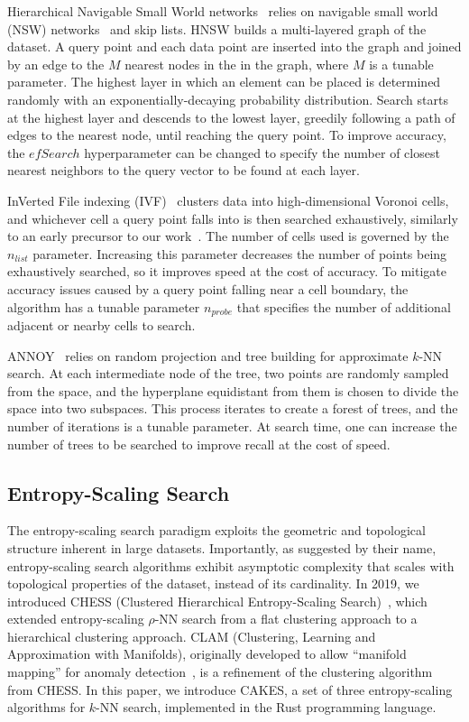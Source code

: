 Hierarchical Navigable Small World networks~\cite{malkov2016hnsw} relies on navigable small world (NSW) networks~\cite{kleinberg2000navigation, boguna2009navigability} and skip lists.
HNSW builds a multi-layered graph of the dataset.
A query point and each data point are inserted into the graph and joined by an edge to the $M$ nearest nodes in the in the graph, where $M$ is a tunable parameter.
The highest layer in which an element can be placed is determined randomly with an exponentially-decaying probability distribution.
Search starts at the highest layer and descends to the lowest layer, greedily following a path of edges to the nearest node, until reaching the query point.
To improve accuracy, the $efSearch$ hyperparameter can be changed to specify the number of closest nearest neighbors to the query vector to be found at each layer.

InVerted File indexing (IVF)~\cite{faissivf, sacks1987multikey, kent1990signature} clusters data into high-dimensional Voronoi cells, and whichever cell a query point falls into is then searched exhaustively, similarly to an early precursor to our work~\cite{yu2015entropy}.
The number of cells used is governed by the $n_{list}$ parameter.
Increasing this parameter decreases the number of points being exhaustively searched, so it improves speed at the cost of accuracy.
To mitigate accuracy issues caused by a query point falling near a cell boundary, the algorithm has a tunable parameter $n_{probe}$ that specifies the number of additional adjacent or nearby cells to search.

ANNOY~\cite{annoy} relies on random projection and tree building for approximate $k$-NN search.
At each intermediate node of the tree, two points are randomly sampled from the space, and the hyperplane equidistant from them is chosen to divide the space into two subspaces.
This process iterates to create a forest of trees, and the number of iterations is a tunable parameter.
At search time, one can increase the number of trees to be searched to improve recall at the cost of speed.


\subsection{Entropy-Scaling Search}
\label{sec:intoduction:entropy-scaling-search}

The entropy-scaling search paradigm exploits the geometric and topological structure inherent in large datasets.
Importantly, as suggested by their name, entropy-scaling search algorithms exhibit asymptotic complexity that scales with topological properties of the dataset, instead of its cardinality.
In 2019, we introduced CHESS (Clustered Hierarchical Entropy-Scaling Search)~\cite{ishaq2019clustered}, which extended entropy-scaling $\rho$-NN search from a flat clustering approach to a hierarchical clustering approach.
CLAM (Clustering, Learning and Approximation with Manifolds), originally developed to allow ``manifold mapping'' for anomaly detection~\cite{ishaq2021clustered}, is a refinement of the clustering algorithm from CHESS.
In this paper, we introduce CAKES, a set of three entropy-scaling algorithms for $k$-NN search, implemented in the Rust programming language.
